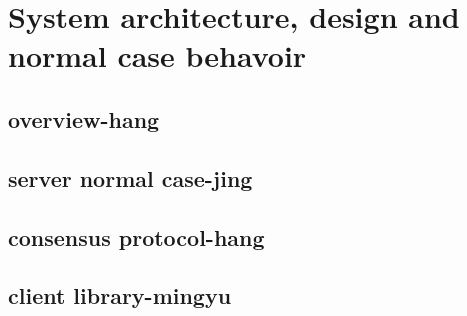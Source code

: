 \section{System architecture, design and normal case behavoir}
\subsection{overview-hang}

\subsection{server normal case-jing}

\subsection{consensus protocol-hang}

\subsection{client library-mingyu}
